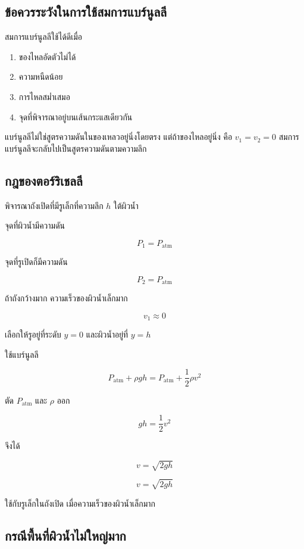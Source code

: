 \subsection{ข้อควรระวังในการใช้สมการแบร์นูลลี}

สมการแบร์นูลลีใช้ได้ดีเมื่อ

\begin{enumerate}
    \item ของไหลอัดตัวไม่ได้
    \item ความหนืดน้อย
    \item การไหลสม่ำเสมอ
    \item จุดที่พิจารณาอยู่บนเส้นกระแสเดียวกัน
\end{enumerate}

\begin{tcolorbox}[title=ข้อควรจำ]
แบร์นูลลีไม่ใช่สูตรความดันในของเหลวอยู่นิ่งโดยตรง แต่ถ้าของไหลอยู่นิ่ง คือ $v_1=v_2=0$ สมการแบร์นูลลีจะกลับไปเป็นสูตรความดันตามความลึก
\end{tcolorbox}

\subsection{กฎของตอร์ริเชลลี}

พิจารณาถังเปิดที่มีรูเล็กที่ความลึก $h$ ใต้ผิวน้ำ

จุดที่ผิวน้ำมีความดัน

\[
P_1=P_{\text{atm}}
\]

จุดที่รูเปิดก็มีความดัน

\[
P_2=P_{\text{atm}}
\]

ถ้าถังกว้างมาก ความเร็วของผิวน้ำเล็กมาก

\[
v_1\approx 0
\]

เลือกให้รูอยู่ที่ระดับ $y=0$ และผิวน้ำอยู่ที่ $y=h$

ใช้แบร์นูลลี

\[
P_{\text{atm}}+\rho gh
=
P_{\text{atm}}+\frac{1}{2}\rho v^2
\]

ตัด $P_{\text{atm}}$ และ $\rho$ ออก

\[
gh=\frac{1}{2}v^2
\]

จึงได้

\[
v=\sqrt{2gh}
\]

\begin{tcolorbox}[title=กฎของตอร์ริเชลลี]
\[
v=\sqrt{2gh}
\]

ใช้กับรูเล็กในถังเปิด เมื่อความเร็วของผิวน้ำเล็กมาก
\end{tcolorbox}

\subsection{กรณีพื้นที่ผิวน้ำไม่ใหญ่มาก}


